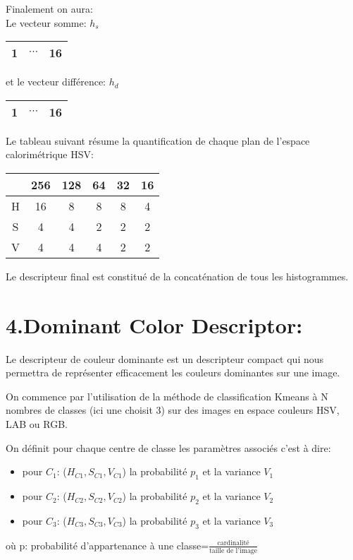 \documentclass[12pt,a4paper,notitlepage]{report}
\begin{document}
Finalement on aura:\\
Le vecteur somme: $h_{s}$
\begin{tabular}{|c|c|c|}
	\hline 1&$\cdots$&16 \\ \hline
\end{tabular}
et le vecteur différence: $h_{d}$
\begin{tabular}{|c|c|c|}
	\hline 1&$\cdots$&16 \\ \hline
\end{tabular}
Le tableau suivant résume la quantification de chaque plan de l'espace calorimétrique HSV:
\begin{center}
\begin{tabular}{|c|c|c|c|c|c|}
	\hline 
	& 256 & 128 & 64 & 32 & 16 \\ \hline
	H& 16 & 8 & 8 & 8 & 4\\ \hline
	S& 4 & 4 & 2 & 2 & 2\\ \hline
	V& 4 & 4 & 4 & 2 & 2\\ \hline
\end{tabular}
\end{center}

Le descripteur final est constitué de la concaténation de tous les histogrammes.


\section*{4.Dominant Color Descriptor:}
Le descripteur de couleur dominante est un descripteur compact qui nous permettra de représenter efficacement les couleurs dominantes sur une image.

On commence par l'utilisation de la méthode de classification Kmeans à N nombres de classes (ici une choisit 3) sur des images en espace couleurs HSV, LAB ou RGB.

On définit pour chaque centre de classe les paramètres associés c'est à dire:
\begin{itemize}
	\item	pour $C_1$: ($H_{C1},S_{C1},V_{C1}$) la probabilité $p_1$ et la variance $V_1$
	\item pour $C_2$: ($H_{C2},S_{C2},V_{C2}$) la probabilité $p_2$ et la variance $V_2$
	\item pour $C_3$: ($H_{C3},S_{C3},V_{C3}$) la probabilité $p_3$ et la variance $V_3$
\end{itemize}  
où p: probabilité d'appartenance à une classe=$\frac{\text{cardinalité}}{\text{taille de l'image}}$
\end{document}
